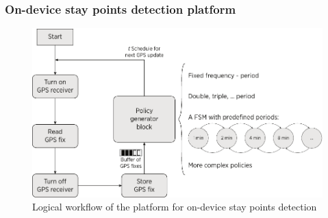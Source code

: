 \documentclass[compress,9pt,xcolor={dvipsnames,table}]{beamer}
\begin{document}
\begin{frame}[t]\frametitle{On-device stay points detection platform}
    
\begin{figure}[tb]
  \centering
  \includegraphics[scale=0.5]{../../../resources/images/vectors/policy-creator-methodology}
  \caption{Logical workflow of the platform for on-device stay points detection}
  \label{fig:logical-workflow}
\end{figure}

\end{frame}
\end{document}
